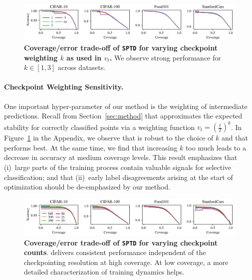 
\begin{figure}[t]
  \centering
  \includegraphics[width=\linewidth]{figs/sptd/k_ablation.pdf}
\caption[Coverage/error trade-off of \texttt{SPTD} for varying checkpoint weighting $k$ as used in $v_t$.]{\textbf{Coverage/error trade-off of \texttt{SPTD} for varying checkpoint weighting $k$ as used in $v_t$.} We observe strong performance for $k \in [1,3]$ across datasets.
}
\label{fig:weighting}
\end{figure}

\paragraph{Checkpoint Weighting Sensitivity.} One important hyper-parameter of our method is the weighting of intermediate predictions. Recall from Section~\ref{sec:method} that \sptd approximates the expected stability for correctly classified points via a weighting function $v_t = (\frac{t}{T})^k$. In Figure~\ref{fig:weighting} in the Appendix, we observe  that \sptd is robust to the choice of $k$ and that  performs best. At the same time, we find that increasing $k$ too much leads to a decrease in accuracy at medium coverage levels. This result emphasizes that (i)~large parts of the training process contain valuable signals for selective classification; and that (ii)~early label disagreements arising at the start of optimization should be de-emphasized by our method.

\begin{figure}[t]
  \centering
  \includegraphics[width=\linewidth]{figs/sptd/checkp_ablation.pdf}
\caption[Coverage/error trade-off of \texttt{SPTD} for varying checkpoint counts.]{\textbf{Coverage/error trade-off of \texttt{SPTD} for varying checkpoint counts}. \sptd delivers consistent performance independent of the checkpointing resolution at high coverage. At low coverage, a more detailed characterization of training dynamics helps.
}
\label{fig:resolution}
\end{figure}

